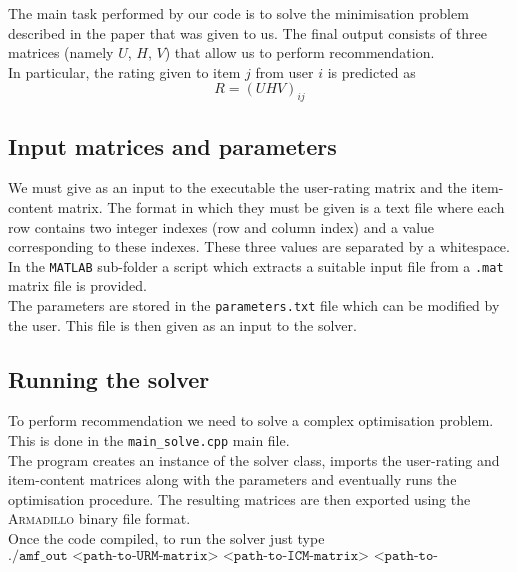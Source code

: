 \documentclass[paper=a4, fontsize=12pt]{scrartcl} %
\numberwithin{equation}{section} %
\numberwithin{figure}{section} %
\numberwithin{table}{section} %
\begin{document}
The main task performed by our code is to solve the minimisation problem described in the paper that was given to us. The final output consists of three matrices  (namely $U$, $H$, $V$) that allow us to perform recommendation. \\

In particular, the rating given to item $j$ from user $i$ is predicted as 
\begin{equation*}
R = (UHV)_{ij} 
\end{equation*}

\subsection{Input matrices and parameters}

We must give as an input to the executable the user-rating matrix and the item-content matrix. The format in which they must be given is a text file where each row contains two integer indexes (row and column index) and a value corresponding to these indexes. These three values are separated by a whitespace. \\

In the \texttt{MATLAB} sub-folder a script which extracts a suitable input file from a \texttt{.mat} matrix file is provided. \\

The parameters are stored in the \texttt{parameters.txt} file which can be modified by the user. This file is then given as an input to the solver. \\

\subsection{Running the solver} 

To perform recommendation  we need to solve a complex optimisation problem. This is done in the \texttt{main\_solve.cpp} main file. \\

The program creates an instance of the solver class, imports the user-rating and item-content matrices along with the parameters and eventually runs the optimisation procedure. The resulting matrices are then exported using the \textsc{Armadillo} binary file format. \\

Once the code compiled, to run the solver just type 
\begin{equation*}
\texttt{./amf\_out <path-to-URM-matrix> <path-to-ICM-matrix> <path-to-parameters-file>}
\end{equation*} 
\end{document}
